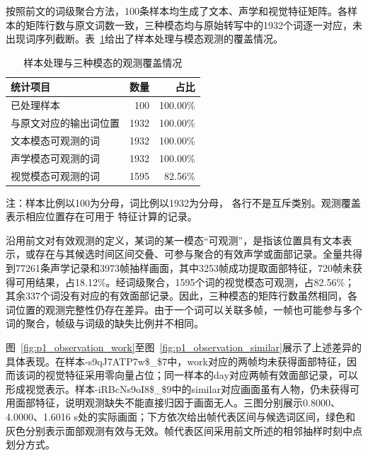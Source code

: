 按照前文的词级聚合方法，100条样本均生成了文本、声学和视觉特征矩阵。各样本的矩阵行数与原文词数一致，三种模态均与原始转写中的1932个词逐一对应，未出现词序列截断。表~\ref{tab:p1_result_overview}给出了样本处理与模态观测的覆盖情况。

\begin{table}[H]
    \centering\small
    \caption{样本处理与三种模态的观测覆盖情况}
    \label{tab:p1_result_overview}
    \renewcommand{\arraystretch}{1.18}
    \setlength{\tabcolsep}{12pt}

    \begin{lrbox}{\pOneResultTableBox}
        \begin{tabular}{@{}lrr@{}}
            \hline
            统计项目 & 数量 & 占比\\
            \hline
            已处理样本 & 100 & 100.00\%\\
            与原文对应的输出词位置 & 1932 & 100.00\%\\
            文本模态可观测的词 & 1932 & 100.00\%\\
            声学模态可观测的词 & 1932 & 100.00\%\\
            视觉模态可观测的词 & 1595 & 82.56\%\\
            \hline
        \end{tabular}
    \end{lrbox}
    \usebox{\pOneResultTableBox}

    \par\smallskip
    \parbox{\wd\pOneResultTableBox}{\footnotesize
        注：样本比例以100为分母，词比例以1932为分母，
        各行不是互斥类别。观测覆盖表示相应位置存在可用于
        特征计算的记录。
    }
\end{table}

沿用前文对有效观测的定义，某词的某一模态“可观测”，是指该位置具有文本表示，或存在与其候选时间区间交叠、可参与聚合的有效声学或面部记录。全量共得到77261条声学记录和3973帧抽样画面，其中3253帧成功提取面部特征，720帧未获得可用结果，占18.12\%。经词级聚合，1595个词的视觉模态可观测，占82.56\%；其余337个词没有对应的有效面部记录。因此，三种模态的矩阵行数虽然相同，各词位置的观测完整性仍存在差异。由于一个词可以关联多帧，一帧也可能参与多个词的聚合，帧级与词级的缺失比例并不相同。

图~\ref{fig:p1_observation_work}至图~\ref{fig:p1_observation_similar}展示了上述差异的具体表现。在样本-s9qJ7ATP7w\$\_\$7中，work对应的两帧均未获得面部特征，因而该词的视觉特征采用零向量占位；同一样本的day对应两帧有效面部记录，可以形成视觉表示。样本-iRBcNs9oI8\$\_\$9中的similar对应画面虽有人物，仍未获得可用面部特征，说明观测缺失不能直接归因于画面无人。三图分别展示0.8000、4.0000、1.6016 s处的实际画面；下方依次给出帧代表区间与候选词区间，绿色和灰色分别表示面部观测有效与无效。帧代表区间采用前文所述的相邻抽样时刻中点划分方式。

